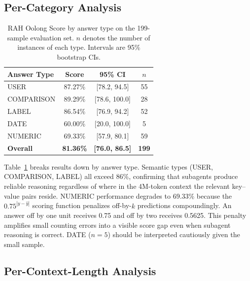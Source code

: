 \documentclass[sigconf,nonacm]{acmart}
\begin{document}
\subsection{Per-Category Analysis}

\begin{table}[t]
\centering
\caption{RAH Oolong Score by answer type on the 199-sample evaluation set.
  $n$ denotes the number of instances of each type. Intervals are 95\% bootstrap CIs.}
\label{tab:per_category}
\begin{tabular}{lccc}
\toprule
Answer Type & Score & 95\% CI & $n$ \\
\midrule
USER       & 87.27\% & [78.2, 94.5]  & 55 \\
COMPARISON & 89.29\% & [78.6, 100.0] & 28 \\
LABEL      & 86.54\% & [76.9, 94.2]  & 52 \\
DATE       & 60.00\% & [20.0, 100.0] &  5 \\
NUMERIC    & 69.33\% & [57.9, 80.1]  & 59 \\
\midrule
\textbf{Overall} & \textbf{81.36\%} & \textbf{[76.0, 86.5]} & \textbf{199} \\
\bottomrule
\end{tabular}
\end{table}

Table~\ref{tab:per_category} breaks results down by answer type.
Semantic types (USER, COMPARISON, LABEL) all exceed 86\%, confirming that
subagents produce reliable reasoning regardless of where in the
4M-token context the relevant key--value pairs reside.
NUMERIC performance degrades to 69.33\% because the $0.75^{|y - \hat{y}|}$
scoring function penalizes off-by-$k$ predictions compoundingly. An answer
off by one unit receives 0.75 and off by two receives 0.5625. This penalty
amplifies small counting errors into a visible score gap even when subagent
reasoning is correct. DATE ($n=5$) should be interpreted
cautiously given the small sample.

\subsection{Per-Context-Length Analysis}
\end{document}
